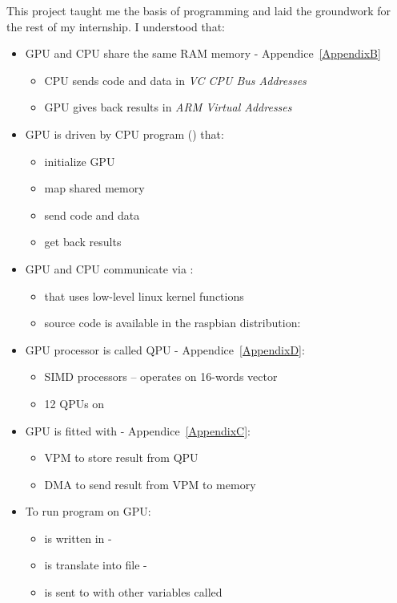 This project taught me the basis of \vc{} programming and laid the groundwork for the rest of my internship. I understood that:
\begin{itemize}
	\item GPU and CPU share the same RAM memory - Appendice~\ref{AppendixB}
		\begin{itemize}
			\item CPU sends code and data in \emph{VC CPU Bus Addresses}
			\item GPU gives back results in \emph{ARM Virtual Addresses}
		\end{itemize}
	\item GPU is driven by CPU program () that:
		\begin{itemize}
			\item initialize GPU
			\item map shared memory
			\item send code and data
			\item get back results
		\end{itemize}
	\item GPU and CPU communicate via \mail{}:
		\begin{itemize}
			\item {} that uses low-level linux kernel functions
			\item source code is available in the raspbian distribution: \code{}
		\end{itemize}
	\item GPU processor is called QPU - Appendice~\ref{AppendixD}:
		\begin{itemize}
			\item SIMD processors -- operates on 16-words vector
			\item 12 QPUs on \vc
		\end{itemize}
	\item GPU is fitted with - Appendice~\ref{AppendixC}:
		\begin{itemize}
			\item VPM to store result from QPU
			\item DMA to send result from VPM to \ram{} memory
		\end{itemize}
	\item To run program on GPU:
		\begin{itemize}
			\item {} is written in  - 
			\item {} is translate into  file - 
			\item {} is sent to  with other variables called 
		\end{itemize}
\end{itemize}
